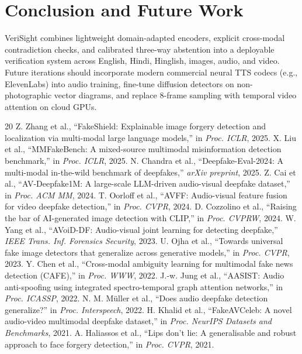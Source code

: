 \documentclass[conference]{IEEEtran}
\begin{document}
\section{Conclusion and Future Work}
VeriSight combines lightweight domain-adapted encoders, explicit cross-modal contradiction checks, and calibrated three-way abstention into a deployable verification system across English, Hindi, Hinglish, images, audio, and video. Future iterations should incorporate modern commercial neural TTS codecs (e.g., ElevenLabs) into audio training, fine-tune diffusion detectors on non-photographic vector diagrams, and replace 8-frame sampling with temporal video attention on cloud GPUs.

\begin{thebibliography}{20}
 Z. Zhang et al., ``FakeShield: Explainable image forgery detection and localization via multi-modal large language models,'' in \textit{Proc. ICLR}, 2025.
 X. Liu et al., ``MMFakeBench: A mixed-source multimodal misinformation detection benchmark,'' in \textit{Proc. ICLR}, 2025.
 N. Chandra et al., ``Deepfake-Eval-2024: A multi-modal in-the-wild benchmark of deepfakes,'' \textit{arXiv preprint}, 2025.
 Z. Cai et al., ``AV-Deepfake1M: A large-scale LLM-driven audio-visual deepfake dataset,'' in \textit{Proc. ACM MM}, 2024.
 T. Oorloff et al., ``AVFF: Audio-visual feature fusion for video deepfake detection,'' in \textit{Proc. CVPR}, 2024.
 D. Cozzolino et al., ``Raising the bar of AI-generated image detection with CLIP,'' in \textit{Proc. CVPRW}, 2024.
 W. Yang et al., ``AVoiD-DF: Audio-visual joint learning for detecting deepfake,'' \textit{IEEE Trans. Inf. Forensics Security}, 2023.
 U. Ojha et al., ``Towards universal fake image detectors that generalize across generative models,'' in \textit{Proc. CVPR}, 2023.
 Y. Chen et al., ``Cross-modal ambiguity learning for multimodal fake news detection (CAFE),'' in \textit{Proc. WWW}, 2022.
 J.-w. Jung et al., ``AASIST: Audio anti-spoofing using integrated spectro-temporal graph attention networks,'' in \textit{Proc. ICASSP}, 2022.
 N. M. M\"uller et al., ``Does audio deepfake detection generalize?'' in \textit{Proc. Interspeech}, 2022.
 H. Khalid et al., ``FakeAVCeleb: A novel audio-video multimodal deepfake dataset,'' in \textit{Proc. NeurIPS Datasets and Benchmarks}, 2021.
 A. Haliassos et al., ``Lips don't lie: A generalisable and robust approach to face forgery detection,'' in \textit{Proc. CVPR}, 2021.

\end{thebibliography}
\end{document}
